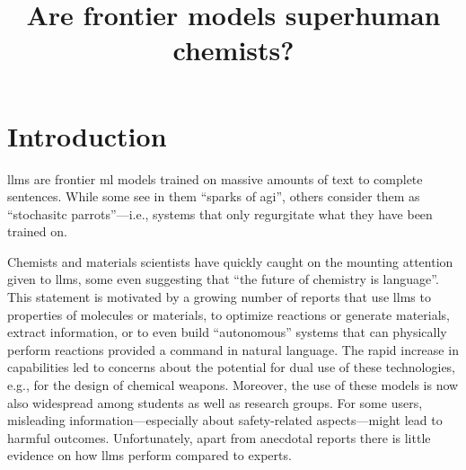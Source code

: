 \documentclass[11pt, oneside]{article}
\title{\textsf{Are frontier models superhuman chemists?}}
\begin{document}
\maketitle

\begin{abstract}
\end{abstract}

\clearpage

\section{Introduction}
\Glspl{llm} are frontier \gls{ml} models trained on massive amounts of text to complete sentences. 
While some see in them \enquote{sparks of \gls{agi}},\cite{bubeck2023sparks} others consider them as \enquote{stochasitc parrots}---i.e., systems that only regurgitate what they have been trained on.\cite{bender2021dangers} 

Chemists and materials scientists have quickly caught on the mounting attention given to \glspl{llm}, some even suggesting that \enquote{the future of chemistry is language}.\cite{White_2023} 
This statement is motivated by a growing number of reports that use \glspl{llm} to properties of molecules or materials,\cite{jablonka202314, jablonka2024leveraging, xie2024fine} to optimize reactions\cite{ramos2023bayesian, kristiadi2024sober} or generate materials,\cite{rubungo2023llm, flam2023language, gruver2024fine} extract information,\cite{Patiny_2023, Dagdelen_2024, Zheng_2024, lála2023paperqa, caufield2023structured} or to even build \enquote{autonomous} systems that can physically perform reactions provided a command in natural language.\cite{bran2023chemcrow, Boiko_2023, darvish2024organa} 
The rapid increase in capabilities led to concerns about the potential for dual use of these technologies, e.g., for the design of chemical weapons.\cite{gopal2023releasing, ganguli2022red, Urbina_2022} 
Moreover, the use of these models is now also widespread among students\cite{Intelligent.com_2023} as well as research groups. For some users, misleading information---especially about safety-related aspects---might lead to harmful outcomes. Unfortunately, apart from anecdotal reports there is little evidence on how \glspl{llm} perform compared to experts.
\end{document}
